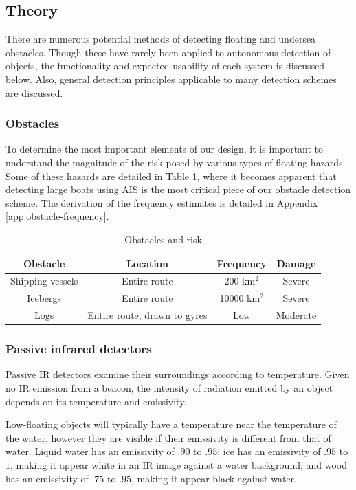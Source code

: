 \subsection{\label{sec:method:theory}Theory}
There are numerous potential methods of detecting floating and undersea obstacles. Though these have rarely been applied to autonomous detection of objects, the functionality and expected usability of each system is discussed below. Also, general detection principles applicable to many detection schemes are discussed.

\subsubsection{\label{sec:method:theory:obstacles}Obstacles}
To determine the most important elements of our design, it is important to understand the magnitude of the risk posed by various types of floating hazards. Some of these hazards are detailed in Table \ref{tab:obstacles}, where it becomes apparent that detecting large boats using AIS is the most critical piece of our obstacle detection scheme. The derivation of the frequency estimates is detailed in Appendix \ref{app:obstacle-frequency}.

\begin{table}
\caption{\label{tab:obstacles}Obstacles and risk}
\begin{tabular}{c|c|c|c}

Obstacle & Location & Frequency & Damage\\[0.6cm]
\hline

Shipping vessels & Entire route &200 km$^2$ & Severe \\
Icebergs & Entire route & 10000 km$^2$ & Severe \\
Logs & Entire route, drawn to gyres & Low & Moderate \\

\end{tabular}
\end{table}

\subsubsection{\label{sec:method:theory:passive-infrared-detectors}Passive infrared detectors}
Passive IR detectors examine their surroundings according to temperature. Given no IR emission from a beacon, the intensity of radiation emitted by an object depends on its temperature and emissivity.

Low-floating objects will typically have a temperature near the temperature of the water, however they are visible if their emissivity is different from that of water. Liquid water has an emissivity of $.90$ to $.95$; ice has an emissivity of $.95$ to $1$, making it appear white in an IR image against a water background; and wood has an emissivity of $.75$ to $.95$, making it appear black against water. \cite{optotherm-emisstable}


